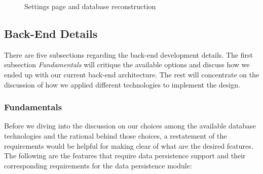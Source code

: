 \documentclass[12pt,a4paper]{article}
\begin{document}
\begin{figure}
                \centering
                \caption{Settings page and database reconstruction}
                \label{fig:settings}
            \end{figure}
            
        \subsection{Back-End Details}
        There are five subsections regarding the back-end development details. The first subsection \textit{Fundamentals} will critique the available options and discuss how we ended up with our current back-end architecture. The rest will concentrate on the discussion of how we applied different technologies to implement the design.
        
            \subsubsection{Fundamentals} %
            \label{db:fundamentals}
            Before we diving into the discussion on our choices among the available database technologies and the rational behind those choices, a restatement of the requirements would be helpful for making clear of what are the desired features. The following are the features that require data persistence support and their corresponding requirements for the data persistence module:
\end{document}
